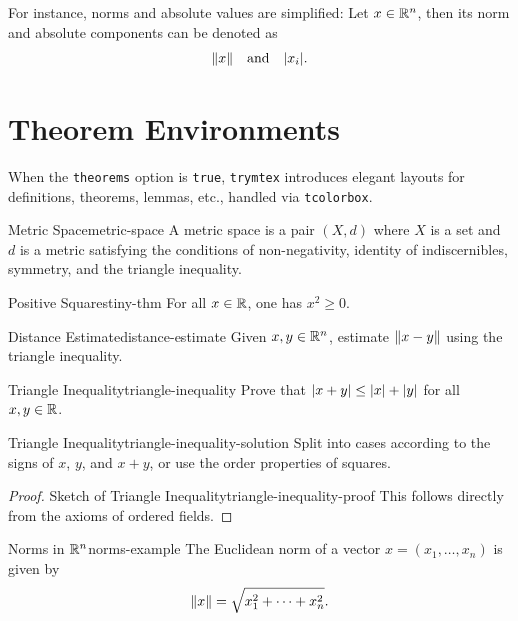 \documentclass{article}
\begin{document}
For instance, norms and absolute values are simplified: Let \( x \in \mathbb{R}^n \), then its norm and absolute components can be denoted as
\[
  \lVert x\rVert \quad \text{and} \quad \lvert x_i\rvert.
\]

\section{Theorem Environments}
When the \texttt{theorems} option is \texttt{true}, \texttt{trymtex} introduces elegant layouts for definitions, theorems, lemmas, etc., handled via \texttt{tcolorbox}.

\begin{definition}{Metric Space}{metric-space}
  A metric space is a pair \( (X,d) \) where \( X \) is a set and \( d \) is a metric satisfying the conditions of non-negativity, identity of indiscernibles, symmetry, and the triangle inequality.
\end{definition}

\begin{theorem}{Positive Squares}{tiny-thm}
  For all \( x \in \mathbb{R} \), one has \( x^2 \ge 0 \).
\end{theorem}

\begin{problem}{Distance Estimate}{distance-estimate}
  Given \( x,y \in \mathbb{R}^n \), estimate \( \lVert x-y\rVert \) using the triangle inequality.
\end{problem}

\begin{exercise}{Triangle Inequality}{triangle-inequality}
  Prove that \( \lvert x+y\rvert \le \lvert x\rvert + \lvert y\rvert \) for all \( x,y \in \mathbb{R} \).
\end{exercise}

\begin{solution}{Triangle Inequality}{triangle-inequality-solution}
  Split into cases according to the signs of \( x \), \( y \), and \( x+y \), or use the order properties of squares.
\end{solution}

\begin{proof}{Sketch of Triangle Inequality}{triangle-inequality-proof}
  This follows directly from the axioms of ordered fields.
\end{proof}

\begin{example}{Norms in \(\mathbb{R}^n\)}{norms-example}
  The Euclidean norm of a vector \( x = (x_1, \ldots, x_n) \) is given by
  \[
    \lVert x\rVert = \sqrt{x_1^2 + \cdots + x_n^2}.
  \]
\end{example}
\end{document}
